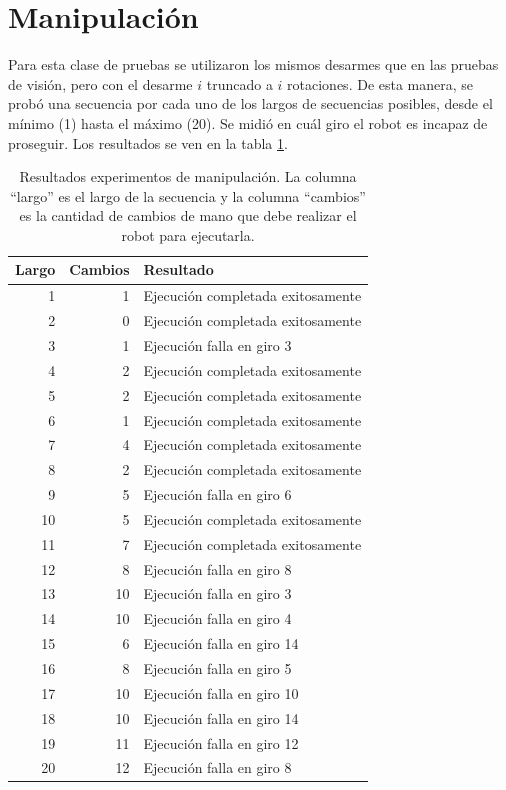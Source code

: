 \section{Manipulación}
Para esta clase de pruebas se utilizaron los mismos desarmes que en las pruebas de visión, pero con el desarme $i$ truncado a $i$ rotaciones. De esta manera, se probó una secuencia por cada uno de los largos de secuencias posibles, desde el mínimo (1) hasta el máximo (20). Se midió en cuál giro el robot es incapaz de proseguir. Los resultados se ven en la tabla \ref{resultadogiros}.

\begin{table}[h!]
	\centering
	\begin{tabular}{|r|r|l|}
		\hline
		Largo & Cambios & Resultado \\ \hline \hline
		 1 & 1 & Ejecución completada exitosamente \\ \hline
		 2 & 0 & Ejecución completada exitosamente \\ \hline
		 3 & 1 & Ejecución falla en giro 3 \\ \hline
		 4 & 2 & Ejecución completada exitosamente \\ \hline
		 5 & 2 & Ejecución completada exitosamente \\ \hline
		 6 & 1 & Ejecución completada exitosamente \\ \hline
		 7 & 4 & Ejecución completada exitosamente \\ \hline
		 8 & 2 & Ejecución completada exitosamente \\ \hline
		 9 & 5 & Ejecución falla en giro 6 \\ \hline
		10 & 5 & Ejecución completada exitosamente \\ \hline
		11 & 7 & Ejecución completada exitosamente \\ \hline
		12 & 8 & Ejecución falla en giro 8 \\ \hline
		13 & 10 & Ejecución falla en giro 3 \\ \hline
		14 & 10 & Ejecución falla en giro 4 \\ \hline
		15 & 6 & Ejecución falla en giro 14 \\ \hline
		16 & 8 & Ejecución falla en giro 5 \\ \hline
		17 & 10 & Ejecución falla en giro 10 \\ \hline
		18 & 10 & Ejecución falla en giro 14 \\ \hline
		19 & 11 & Ejecución falla en giro 12 \\ \hline
		20 & 12 & Ejecución falla en giro 8 \\ \hline
	\end{tabular}
	\caption{Resultados experimentos de manipulación. La columna ``largo'' es el largo de la secuencia y la columna ``cambios'' es la cantidad de cambios de mano que debe realizar el robot para ejecutarla.}
	\label{resultadogiros}
\end{table}

